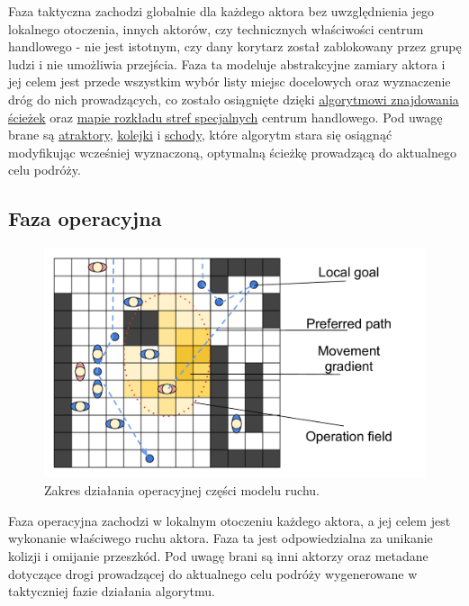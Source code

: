 \documentclass[a4paper, 12pt]{article}
\begin{document}

\noindent
Faza taktyczna zachodzi globalnie dla każdego aktora bez uwzględnienia jego lokalnego otoczenia, innych aktorów, czy technicznych właściwości centrum handlowego - nie jest istotnym, czy dany korytarz został zablokowany przez grupę ludzi i nie umożliwia przejścia. Faza ta modeluje abstrakcyjne zamiary aktora i jej celem jest przede wszystkim wybór listy miejsc docelowych oraz wyznaczenie dróg do nich prowadzących, co zostało osiągnięte dzięki \hyperref[sec:path-finding]{algorytmowi znajdowania ścieżek} oraz \hyperref[sec:mall-impl]{mapie rozkładu stref specjalnych} centrum handlowego. Pod uwagę brane są \hyperref[sec:attractors]{atraktory}, \hyperref[sec:queues]{kolejki} i \hyperref[sec:entrance-exits]{schody}, które algorytm stara się osiągnąć modyfikując wcześniej wyznaczoną, optymalną ścieżkę prowadzącą do aktualnego celu podróży.

        \subsection{Faza operacyjna}
        \label{sec:operational}

        \begin{figure}[h!]
            \centering
            \includegraphics[scale=0.3]{./img/Operative.pdf}
            \caption{Zakres działania operacyjnej części modelu ruchu.}
            \label{fig:operational}
        \end{figure}


\noindent
Faza operacyjna zachodzi w lokalnym otoczeniu każdego aktora, a jej celem jest wykonanie właściwego ruchu aktora. Faza ta jest odpowiedzialna za unikanie kolizji i omijanie przeszkód. Pod uwagę brani są inni aktorzy oraz metadane dotyczące drogi prowadzącej do aktualnego celu podróży wygenerowane w taktyczniej fazie działania algorytmu.
\end{document}
